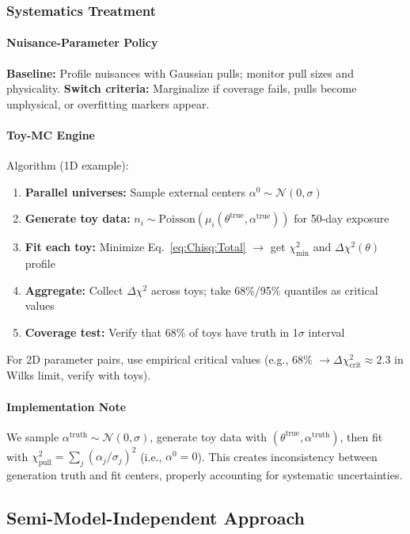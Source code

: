 \subsubsection{Systematics Treatment}

\paragraph{Nuisance-Parameter Policy}
\textbf{Baseline:} Profile nuisances with Gaussian pulls; monitor pull sizes and physicality.
\textbf{Switch criteria:} Marginalize if coverage fails, pulls become unphysical, or overfitting markers appear.

\paragraph{Toy-MC Engine}
Algorithm (1D example):
\begin{enumerate}
  \item \textbf{Parallel universes:} Sample external centers $\alpha^0 \sim \mathcal{N}(0, \sigma)$
  \item \textbf{Generate toy data:} $n_i \sim \text{Poisson}(\mu_i(\theta^{\text{true}}, \alpha^{\text{true}}))$ for 50-day exposure
  \item \textbf{Fit each toy:} Minimize Eq.~\eqref{eq:Chisq:Total} $\rightarrow$ get $\chi^2_{\min}$ and $\Delta\chi^2(\theta)$ profile
  \item \textbf{Aggregate:} Collect $\Delta\chi^2$ across toys; take 68\%/95\% quantiles as critical values
  \item \textbf{Coverage test:} Verify that 68\% of toys have truth in 1$\sigma$ interval
\end{enumerate}

For 2D parameter pairs, use empirical critical values (e.g., 68\% $\rightarrow \Delta\chi^2_{\text{crit}} \approx 2.3$ in Wilks limit, verify with toys).

\paragraph{Implementation Note}
We sample $\alpha^{\text{truth}} \sim \mathcal{N}(0, \sigma)$, generate toy data with $(\theta^{\text{true}}, \alpha^{\text{truth}})$,
then fit with $\chi^2_{\text{pull}} = \sum_j (\alpha_j/\sigma_j)^2$ (i.e., $\alpha^0=0$).
This creates inconsistency between generation truth and fit centers, properly accounting for systematic uncertainties.


\subsection{Semi-Model-Independent Approach}
\label{subsec:FluxInComb}

